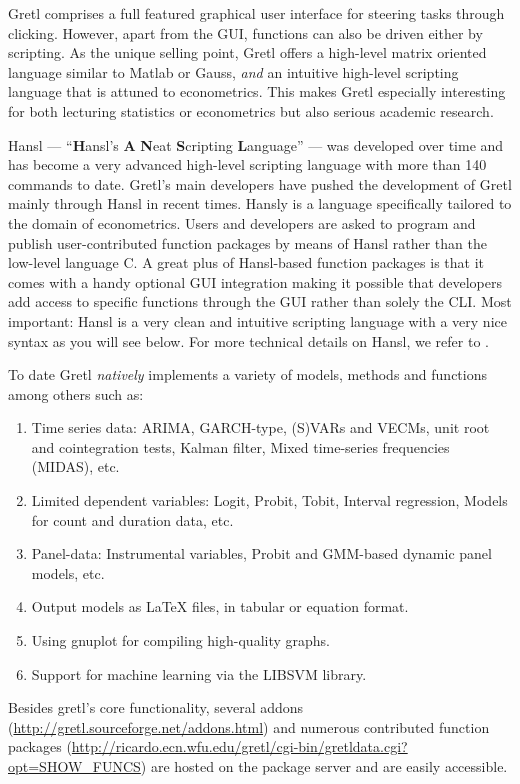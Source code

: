 \documentclass[11pt]{article}
\begin{document}
Gretl comprises a full featured graphical user interface for steering tasks through clicking. However, apart from the GUI, functions can also be driven either by scripting. As the unique selling point, Gretl offers a high-level matrix oriented language similar to Matlab or Gauss, \textit{and} an intuitive high-level scripting language that is attuned to econometrics. This makes Gretl especially interesting for both lecturing statistics or econometrics but also serious academic research.

Hansl --- “\textbf{H}ansl’s \textbf{A} \textbf{N}eat \textbf{S}cripting \textbf{L}anguage” --- was developed over time and has become a very advanced high-level scripting language with more than 140 commands to date. Gretl's main developers have pushed the development of Gretl mainly through Hansl in recent times. Hansly is a language specifically tailored to the domain of econometrics. Users and developers are asked to program and publish user-contributed function packages by means of Hansl rather than the low-level language C. A great plus of Hansl-based function packages is that it comes with a handy optional GUI integration making it possible that developers add access to specific functions through the GUI rather than solely the CLI. Most important: Hansl is a very clean and intuitive scripting language with a very nice syntax as you will see below. For more technical details on Hansl, we refer to \citet{Cottrell2017}.


To date Gretl \textit{natively} implements a variety of models, methods and functions among others such as: 
\begin{enumerate}
	\item Time series data: ARIMA, GARCH-type, (S)VARs and VECMs, unit root and cointegration tests, Kalman filter, Mixed time-series frequencies (MIDAS), etc.
	\item Limited dependent variables: Logit, Probit, Tobit, Interval regression, Models for count and duration data, etc.
	\item Panel-data: Instrumental variables, Probit and
	GMM-based dynamic panel models, etc.
	\item Output models as LaTeX files, in tabular or equation format.
	\item Using gnuplot for compiling high-quality graphs.
	\item Support for machine learning via the LIBSVM library.
\end{enumerate}
Besides gretl's core functionality, several addons (\url{http://gretl.sourceforge.net/addons.html}) and numerous contributed function packages (\url{http://ricardo.ecn.wfu.edu/gretl/cgi-bin/gretldata.cgi?opt=SHOW_FUNCS}) are hosted on the package server and are easily accessible.
\end{document}
